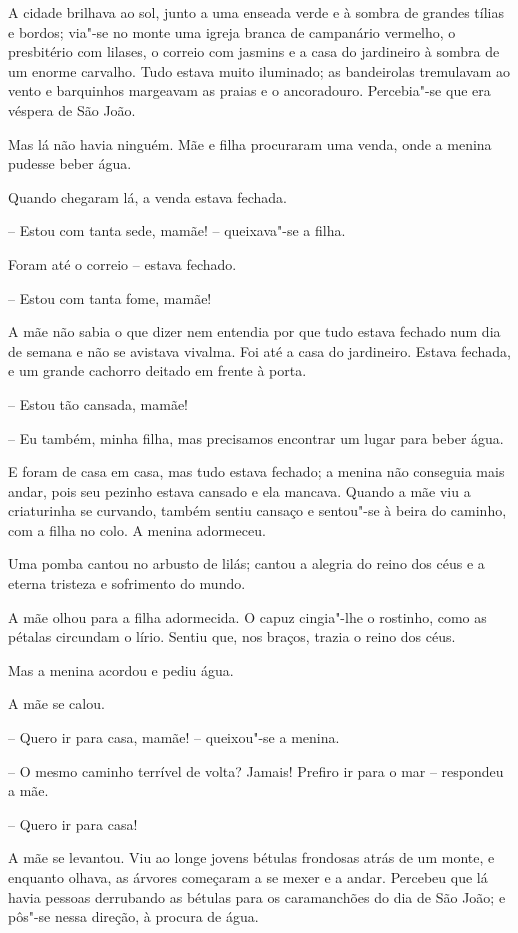 A cidade brilhava ao sol, junto a uma enseada verde e à sombra de
grandes tílias e bordos; via"-se no monte uma igreja branca de
campanário vermelho, o presbitério com lilases, o correio com jasmins e
a casa do jardineiro à sombra de um enorme carvalho. Tudo estava muito
iluminado; as bandeirolas tremulavam ao vento e barquinhos margeavam as
praias e o ancoradouro. Percebia"-se que era véspera de São João. 

Mas lá não havia ninguém. Mãe e filha procuraram uma venda, onde a
menina pudesse beber água. 

Quando chegaram lá, a venda estava fechada.

-- Estou com tanta sede, mamãe! -- queixava"-se a filha.

Foram até o correio -- estava fechado.

-- Estou com tanta fome, mamãe!

A mãe não sabia o que dizer nem entendia por que tudo estava fechado num
dia de semana e não se avistava vivalma. Foi até a casa do jardineiro. 
Estava fechada, e um grande cachorro deitado em frente à porta.

-- Estou tão cansada, mamãe!

-- Eu também, minha filha, mas precisamos encontrar um lugar para beber
água.

E foram de casa em casa, mas tudo estava fechado; a menina não conseguia
mais andar, pois seu pezinho estava cansado e ela mancava. Quando a mãe
viu a criaturinha se curvando, também sentiu cansaço e sentou"-se à
beira do caminho, com a filha no colo. A menina adormeceu.

Uma pomba cantou no arbusto de lilás; cantou a alegria do reino dos céus
e a eterna tristeza e sofrimento do mundo.

A mãe olhou para a filha adormecida. O capuz cingia"-lhe o rostinho,
como as pétalas circundam o lírio. Sentiu que, nos braços, trazia o
reino dos céus. 

Mas a menina acordou e pediu água.

A mãe se calou.

-- Quero ir para casa, mamãe! -- queixou"-se a menina.

-- O mesmo caminho terrível de volta? Jamais! Prefiro ir para o mar --
respondeu a mãe.

-- Quero ir para casa!

A mãe se levantou. Viu ao longe jovens bétulas frondosas atrás de um
monte, e enquanto olhava, as árvores começaram a se mexer e a andar.
Percebeu que lá havia pessoas derrubando as bétulas para os
caramanchões do dia de São João; e pôs"-se nessa direção, à procura de
água.

